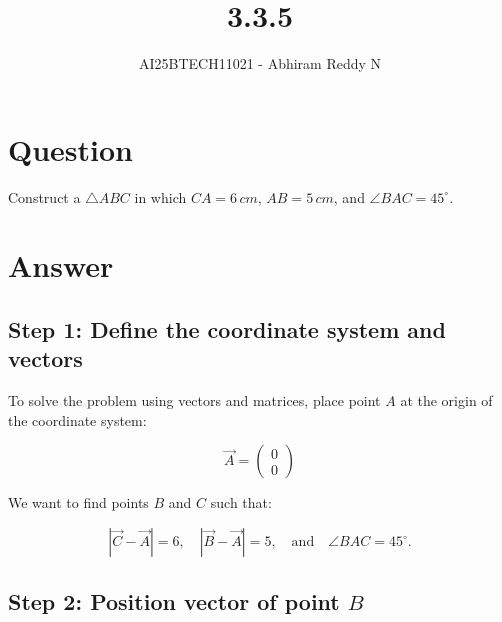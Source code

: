 \documentclass[journal]{IEEEtran}
\begin{document}

\vspace{3cm}

\title{3.3.5}
\author{AI25BTECH11021 - Abhiram Reddy N}
{\let\newpage\relax\maketitle}

\renewcommand{\thefigure}{\theenumi}
\renewcommand{\thetable}{\theenumi}
\setlength{\intextsep}{10pt} %


\renewcommand{\thetable}{\theenumi}


\section*{\textbf{Question}}
Construct a $\triangle ABC$ in which $CA = 6\,cm$, $AB = 5\,cm$, and $\angle BAC = 45^\circ$.

\section*{\textbf{Answer}}

\subsection*{\textbf{Step} 1: Define the coordinate system and vectors}

To solve the problem using vectors and matrices, place point $A$ at the origin of the coordinate system:

\[
\vec{A} = \begin{pmatrix}0 \\ 0\end{pmatrix}
\]

We want to find points $B$ and $C$ such that:

\[
|\vec{C} - \vec{A}| = 6, \quad |\vec{B} - \vec{A}| = 5, \quad \text{and} \quad \angle BAC = 45^\circ.
\]

\subsection*{\textbf{Step} 2: Position vector of point $B$}
\end{document}
